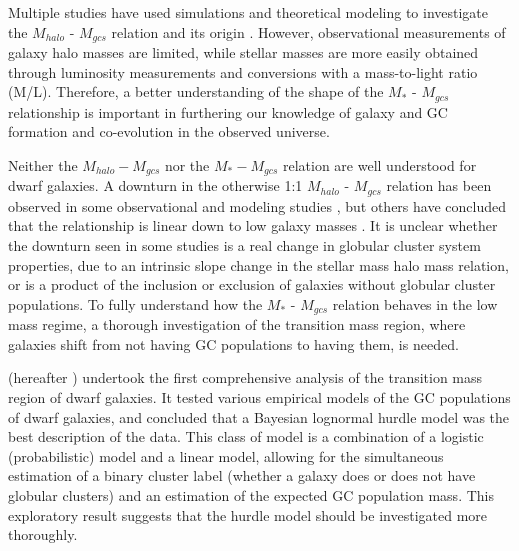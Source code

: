 \documentclass[twocolumn]{aastex631}
\begin{document}
Multiple studies have used simulations and theoretical modeling to investigate the $M_{halo}$ - $M_{gcs}$ relation and its origin \citep{ElBadry2019, Choksi2019, Bastian2020, Chen2023}. However, observational measurements of galaxy halo masses are limited, while stellar masses are more easily obtained through luminosity measurements and conversions with a mass-to-light ratio (M/L). Therefore, a better understanding of the shape of the $M_*$ - $M_{gcs}$ relationship is important in furthering our knowledge of galaxy and GC formation and co-evolution in the observed universe. 

Neither the $M_{halo}-M_{gcs}$ nor the $M_*-M_{gcs}$ relation are well understood for dwarf galaxies. A downturn in the otherwise 1:1 $M_{halo}$ - $M_{gcs}$ relation has been observed in some observational and modeling studies \citep[e.g.][]{Choksi2019, Bastian2020}, but others have concluded that the relationship is linear down to low galaxy masses \citep{Spitler2009, Hudson2014, Harris2017}. It is unclear whether the downturn seen in some studies is a real change in globular cluster system properties, due to an intrinsic slope change in the stellar mass halo mass relation, or is a product of the inclusion or exclusion of galaxies without globular cluster populations. To fully understand how the $M_*$ - $M_{gcs}$ relation behaves in the low mass regime, a thorough investigation of the transition mass region, where galaxies shift from not having GC populations to having them, is needed. 

\citet{Eadie2022} (hereafter ) undertook the first comprehensive analysis of the transition mass region of dwarf galaxies. It tested various empirical models of the GC populations of dwarf galaxies, and concluded that a Bayesian lognormal hurdle model was the best description of the data. This class of model is a combination of a logistic (probabilistic) model and a linear model, allowing for the simultaneous estimation of a binary cluster label (whether a galaxy does or does not have globular clusters) and an estimation of the expected GC population mass. This exploratory result suggests that the hurdle model should be investigated more thoroughly.  
\end{document}
